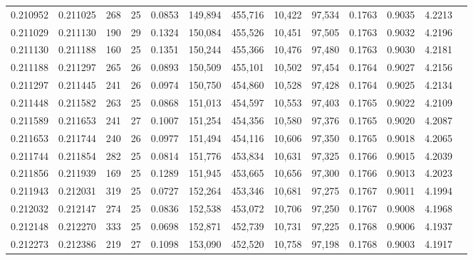 \begin{tabular}{rrrrrrrrrrrrr}
0.210952 & 0.211025 &   268 &  25 &                                     0.0853 & 149,894 & 455,716 &  10,422 &  97,534 & 0.1763 & 0.9035 & 4.2213 \\
0.211029 & 0.211130 &   190 &  29 &                                     0.1324 & 150,084 & 455,526 &  10,451 &  97,505 & 0.1763 & 0.9032 & 4.2196 \\
0.211130 & 0.211188 &   160 &  25 &                                     0.1351 & 150,244 & 455,366 &  10,476 &  97,480 & 0.1763 & 0.9030 & 4.2181 \\
0.211188 & 0.211297 &   265 &  26 &                                     0.0893 & 150,509 & 455,101 &  10,502 &  97,454 & 0.1764 & 0.9027 & 4.2156 \\
0.211297 & 0.211445 &   241 &  26 &                                     0.0974 & 150,750 & 454,860 &  10,528 &  97,428 & 0.1764 & 0.9025 & 4.2134 \\
0.211448 & 0.211582 &   263 &  25 &                                     0.0868 & 151,013 & 454,597 &  10,553 &  97,403 & 0.1765 & 0.9022 & 4.2109 \\
0.211589 & 0.211653 &   241 &  27 &                                     0.1007 & 151,254 & 454,356 &  10,580 &  97,376 & 0.1765 & 0.9020 & 4.2087 \\
0.211653 & 0.211744 &   240 &  26 &                                     0.0977 & 151,494 & 454,116 &  10,606 &  97,350 & 0.1765 & 0.9018 & 4.2065 \\
0.211744 & 0.211854 &   282 &  25 &                                     0.0814 & 151,776 & 453,834 &  10,631 &  97,325 & 0.1766 & 0.9015 & 4.2039 \\
0.211856 & 0.211939 &   169 &  25 &                                     0.1289 & 151,945 & 453,665 &  10,656 &  97,300 & 0.1766 & 0.9013 & 4.2023 \\
0.211943 & 0.212031 &   319 &  25 &                                     0.0727 & 152,264 & 453,346 &  10,681 &  97,275 & 0.1767 & 0.9011 & 4.1994 \\
0.212032 & 0.212147 &   274 &  25 &                                     0.0836 & 152,538 & 453,072 &  10,706 &  97,250 & 0.1767 & 0.9008 & 4.1968 \\
0.212148 & 0.212270 &   333 &  25 &                                     0.0698 & 152,871 & 452,739 &  10,731 &  97,225 & 0.1768 & 0.9006 & 4.1937 \\
0.212273 & 0.212386 &   219 &  27 &                                     0.1098 & 153,090 & 452,520 &  10,758 &  97,198 & 0.1768 & 0.9003 & 4.1917 \\

\end{tabular}
